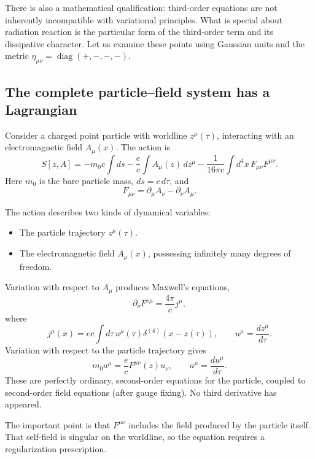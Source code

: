 There is also a mathematical qualification: third-order equations are not
inherently incompatible with variational principles. What is special about
radiation reaction is the particular form of the third-order term and its
dissipative character.
Let us examine these points using Gaussian units and the metric
\(\eta_{\mu\nu}=\operatorname{diag}(+,-,-,-)\).
\subsection{ The complete particle–field system has a Lagrangian}
Consider a charged point particle with worldline \(z^\mu(\tau)\), interacting
with an electromagnetic field \(A_\mu(x)\).
The action is
\[
\boxed{
S[z,A]=
-m_0c\int ds
-\frac{e}{c}\int A_\mu(z)\,dz^\mu
-\frac{1}{16\pi c}\int d^4x\,F_{\mu\nu}F^{\mu\nu}.
}
\]
Here \(m_0\) is the bare particle mass, \(ds=c\,d\tau\), and
\[
F_{\mu\nu}=\partial_\mu A_\nu-\partial_\nu A_\mu.
\]

The action describes two kinds of dynamical variables:
\begin{itemize}
   \item The particle trajectory \(z^\mu(\tau)\).
   \item The electromagnetic field \(A_\mu(x)\), possessing infinitely many
       degrees of freedom.
\end{itemize}
Variation with respect to \(A_\mu\) produces Maxwell's equations,
\[
\partial_\nu F^{\nu\mu}
=\frac{4\pi}{c}j^\mu,
\]
where
\[
j^\mu(x)=ec\int d\tau\,
u^\mu(\tau)\delta^{(4)}(x-z(\tau)),
\qquad
u^\mu=\frac{dz^\mu}{d\tau}.
\]
Variation with respect to the particle trajectory gives
\[
m_0 a^\mu=\frac{e}{c}F^{\mu\nu}(z)u_\nu,
\qquad
a^\mu=\frac{du^\mu}{d\tau}.
\]
These are perfectly ordinary, second-order equations for the particle, coupled
to second-order field equations (after gauge fixing).
No third derivative has appeared.

The important point is that \(F^{\mu\nu}\) includes the field produced by the
particle itself. That self-field is singular on the worldline, so the equation
requires a regularization prescription.


